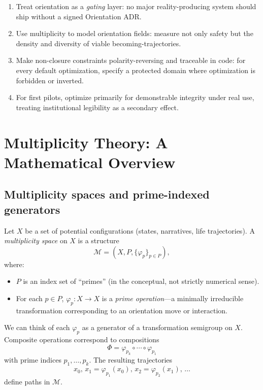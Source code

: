 \documentclass[11pt]{article}
\begin{document}
\begin{enumerate}[nosep]
  \item Treat orientation as a \emph{gating} layer: no major reality-producing system should ship without a signed Orientation ADR.
  \item Use multiplicity to model orientation fields: measure not only safety but the density and diversity of viable becoming-trajectories.
  \item Make non-closure constraints polarity-reversing and traceable in code: for every default optimization, specify a protected domain where optimization is forbidden or inverted.
  \item For first pilots, optimize primarily for demonstrable integrity under real use, treating institutional legibility as a secondary effect.
\end{enumerate}

\newpage

\section{Multiplicity Theory: A Mathematical Overview}

\subsection{Multiplicity spaces and prime-indexed generators}

Let \(X\) be a set of potential configurations (states, narratives, life trajectories). A \emph{multiplicity space} on \(X\) is a structure
\[
\mathcal{M} = (X, P, \{\varphi_p\}_{p \in P}),
\]
where:
\begin{itemize}[nosep]
  \item \(P\) is an index set of ``primes'' (in the conceptual, not strictly numerical sense).
  \item For each \(p \in P\), \(\varphi_p : X \to X\) is a \emph{prime operation}---a minimally irreducible transformation corresponding to an orientation move or interaction.
\end{itemize}

We can think of each \(\varphi_p\) as a generator of a transformation semigroup on \(X\). Composite operations correspond to compositions
\[
\Phi = \varphi_{p_k} \circ \cdots \circ \varphi_{p_1}
\]
with prime indices \(p_1, \dots, p_k\). The resulting trajectories
\[
x_0,\, x_1 = \varphi_{p_1}(x_0),\, x_2 = \varphi_{p_2}(x_1),\, \dots
\]
define paths in \(\mathcal{M}\).
\end{document}
